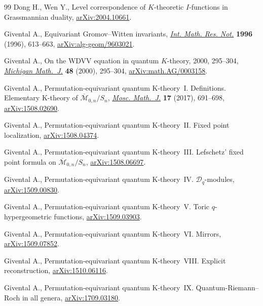 \documentclass[10pt,a4paper]{amsart}
\numberwithin{equation}{section}
\theoremstyle{definition}
\theoremstyle{plain}
\begin{document}
\begin{thebibliography}{99}
Dong H., Wen Y., Level correspondence of {$K$}-theoretic {$I$}-functions in
 {G}rassmannian duality, \href{https://arxiv.org/abs/2004.10661}{arXiv:2004.10661}.

Givental A., Equivariant {G}romov--{W}itten invariants, \href{https://doi.org/10.1155/S1073792896000414}{\textit{Int. Math. Res.
 Not.}} \textbf{1996} (1996), 613--663, \href{https://arxiv.org/abs/alg-geom/9603021}{arXiv:alg-geom/9603021}.

Givental A., On the {WDVV} equation in quantum {$K$}-theory, 2000, 295--304, \href{https://doi.org/10.1307/mmj/1030132720}{\textit{Michigan Math.~J.}} \textbf{48} (2000), 295--304, \href{https://arxiv.org/abs/math.AG/0003158}{arXiv:math.AG/0003158}.

Givental A., Permutation-equivariant quantum {K}-theory~{I}. {D}efinitions.
 {E}lementary {K}-theory of {$\overline{\mathcal M}_{0,n}/S_n$}, \href{https://doi.org/10.17323/1609-4514-2016-16-4-691-698}{\textit{Mosc.
 Math.~J.}} \textbf{17} (2017), 691--698, \href{https://arxiv.org/abs/1508.02690}{arXiv:1508.02690}.

Givental A., Permutation-equivariant quantum {K}-theory~{II}. Fixed point
 localization, \href{https://arxiv.org/abs/1508.04374}{arXiv:1508.04374}.

Givental A., Permutation-equivariant quantum {K}-theory~{III}. {L}efschetz'
 fixed point formula on {${\overline{\mathcal M}}_{0,n}/S_n$},
 \href{https://arxiv.org/abs/1508.06697}{arXiv:1508.06697}.

Givental A., Permutation-equivariant quantum {K}-theory~{IV}. {${\mathcal
 D}_q$}-modules, \href{https://arxiv.org/abs/1509.00830}{arXiv:1509.00830}.

Givental A., Permutation-equivariant quantum {K}-theory~{V}. {T}oric
 {$q$}-hypergeometric functions, \href{https://arxiv.org/abs/1509.03903}{arXiv:1509.03903}.

Givental A., Permutation-equivariant quantum {K}-theory~{VI}. {M}irrors,
 \href{https://arxiv.org/abs/1509.07852}{arXiv:1509.07852}.

Givental A., Permutation-equivariant quantum {K}-theory~{VIII}. {E}xplicit
 reconstruction, \href{https://arxiv.org/abs/1510.06116}{arXiv:1510.06116}.

Givental A., Permutation-equivariant quantum {K}-theory~{IX}.
 {Q}uantum-{R}iemann--{R}och in all genera, \href{https://arxiv.org/abs/1709.03180}{arXiv:1709.03180}.


\end{thebibliography}
\end{document}
